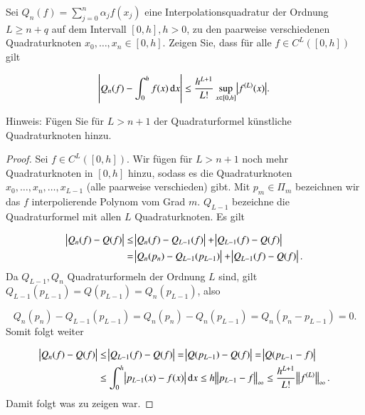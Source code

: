 
\begin{exercise}
  Sei $Q_n(f)=\sum_{j=0}^n{\alpha_j f(x_j)}$ eine Interpolationsquadratur der Ordnung $L \geq n+q$ auf dem Intervall $[0,h], h>0$, zu den paarweise verschiedenen Quadraturknoten $x_0,\dots,x_n \in [0,h]$. Zeigen Sie, dass für alle $f \in C^L([0,h])$ gilt

  \begin{equation*}
    \abs{Q_n(f)-\int_0^h{f(x) \dif x}} \leq \frac{h^{L+1}}{L!} \sup_{x\in[0,h]}{\abs{f^{(L)}(x)}}.
  \end{equation*}

  Hinweis: Fügen Sie für $L>n+1$ der Quadraturformel künstliche Quadraturknoten hinzu.
\end{exercise}
\begin{proof}
  Sei $f \in C^L([0,h])$. Wir fügen für $L>n+1$ noch mehr Quadraturknoten in $[0,h]$ hinzu, sodass es die Quadraturknoten $x_0,\dots,x_n,\dots,x_{L-1}$ (alle paarweise verschieden) gibt. Mit $p_m \in \Pi_m$ bezeichnen wir das $f$ interpolierende Polynom vom Grad $m$. $Q_{L-1}$ bezeichne die Quadraturformel mit allen $L$ Quadraturknoten. Es gilt

  \begin{equation*}
    \begin{split}
      \abs{Q_n(f)-Q(f)}
      &\leq \abs{Q_n(f)-Q_{L-1}(f)} + \abs{Q_{L-1}(f) - Q(f)} \\
      &= \abs{Q_n(p_n) - Q_{L-1}(p_{L-1})} + \abs{Q_{L-1}(f) - Q(f)}.
    \end{split}
  \end{equation*}
  Da $Q_{L-1},Q_n$ Quadraturformeln der Ordnung $L$ sind, gilt $Q_{L-1}(p_{L-1})=Q(p_{L-1})=Q_n(p_{L-1})$, also

  \begin{equation*}
    Q_n(p_n)-Q_{L-1}(p_{L-1})=Q_n(p_n)-Q_n(p_{L-1})=Q_n(p_n - p_{L-1})=0.
  \end{equation*}
  Somit folgt weiter

  \begin{equation*}
    \begin{split}
      \abs{Q_n(f)-Q(f)}
      &\leq \abs{Q_{L-1}(f)-Q(f)}
      = \abs{Q(p_{L-1})-Q(f)}
      = \abs{Q(p_{L-1} - f)} \\
      &\leq \int_0^h{\abs{p_{L-1}(x)-f(x)} \dif x} \leq h \norm{p_{L-1} - f}_\infty \leq \frac{h^{L+1}}{L!}\norm{f^{(L)}}_\infty.
    \end{split}
  \end{equation*}
  Damit folgt was zu zeigen war.
\end{proof}
